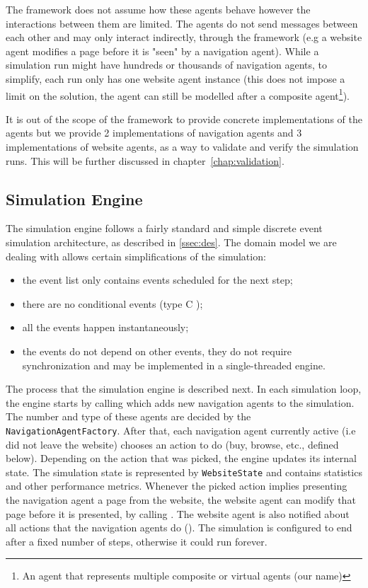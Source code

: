 The framework does not assume how these agents behave however the interactions 
between them are limited. The agents do not send messages between each other 
and may only interact indirectly, through the framework (e.g a website agent 
modifies a page before it is "seen" by a navigation agent). While a simulation 
run might have hundreds or thousands of navigation agents, to simplify, each 
run only has one website agent instance (this does not impose a limit on the 
solution, the agent can still be modelled after a composite agent\footnote{An 
    agent that represents multiple composite or virtual agents (our name)}).

It is out of the scope of the framework to provide concrete implementations of 
the agents but we provide 2 implementations of navigation agents and 3 
implementations of website agents, as a way to validate and verify the 
simulation runs. This will be further discussed in 
chapter~\ref{chap:validation}.

\subsection{Simulation Engine}

The simulation engine follows a fairly standard and simple discrete event 
simulation architecture, as described in \ref{ssec:des}. The domain model we 
are dealing with allows certain simplifications of the simulation:

\begin{itemize}
    \item the event list only contains events scheduled for the next step;
    \item there are no conditional events (type C \cite{pidd1998computer});
    \item all the events happen instantaneously;
    \item the events do not depend on other events, they do not require 
    synchronization and may be implemented in a single-threaded engine.
\end{itemize}

The process that the simulation engine is described next. In each simulation 
loop, the engine starts by calling  which adds 
new navigation agents to the simulation. The number and type of these agents 
are decided by the \texttt{NavigationAgentFactory}. After that, each 
navigation agent currently active (i.e did not leave the website) chooses an 
action to do (buy, browse, etc., defined below). Depending on the action that 
was picked, the engine updates its internal state. The simulation state is 
represented by \texttt{WebsiteState} and contains statistics and other 
performance metrics. Whenever the picked action implies presenting the 
navigation agent a page from the website, the website agent can modify that 
page before it is presented, by calling . 
The website agent is also notified about all actions that the navigation agents 
do (). The simulation is configured to end 
after a fixed number of steps, otherwise it could run forever.

